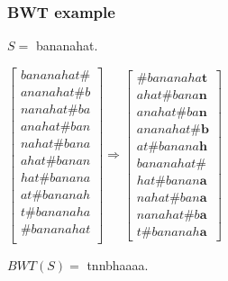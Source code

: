 \documentclass{beamer}
\begin{document}
\begin{frame}
\frametitle{BWT example}
$S = $ bananahat.
\begin{center}
$\begin{bmatrix}
	bananahat\#\\
	ananahat\#b\\
	nanahat\#ba\\
	anahat\#ban\\
	nahat\#bana\\
	ahat\#banan\\
	hat\#banana\\
	at\#bananah\\
	t\#bananaha\\
	\#bananahat\\
\end{bmatrix} \Rightarrow
\begin{bmatrix}
	\#bananaha\textbf{t}\\
	ahat\#bana\textbf{n}\\
	anahat\#ba\textbf{n}\\
	ananahat\#\textbf{b}\\
	at\#banana\textbf{h}\\
	bananahat\#\\
	hat\#banan\textbf{a}\\
	nahat\#ban\textbf{a}\\
	nanahat\#b\textbf{a}\\
	t\#bananah\textbf{a}
\end{bmatrix}$
\end{center}
$BWT(S) = $ tnnbhaaaa.
\end{frame}
\end{document}

